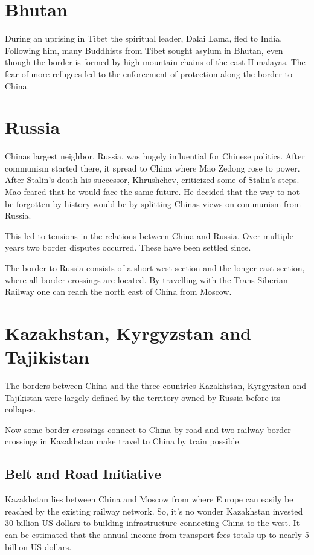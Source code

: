 \documentclass[conference]{IEEEtran}
\begin{document}
	\section{Bhutan}
	During an uprising in Tibet the spiritual leader, Dalai Lama, fled to India\cite{time_howAndWhyTheDalaiLamaLeftTibet}. Following him, many Buddhists from Tibet sought asylum in Bhutan, even though the border is formed by high mountain chains of the east Himalayas. The fear of more refugees led to the enforcement of protection along the border to China.
	
	\section{Russia}
	Chinas largest neighbor, Russia, was hugely influential for Chinese politics. After communism started there, it spread to China where Mao Zedong rose to power. After Stalin's death his successor, Khrushchev, criticized some of Stalin's steps. Mao feared that he would face the same future. He decided that the way to not be forgotten by history would be by splitting Chinas views on communism from Russia.
	
	This led to tensions in the relations between China and Russia. Over multiple years two border disputes occurred. These have been settled since.
	
	The border to Russia consists of a short west section and the longer east section, where all border crossings are located. By travelling with the Trans-Siberian Railway one can reach the north east of China from Moscow.
	
	\section{Kazakhstan, Kyrgyzstan and Tajikistan}
	The borders between China and the three countries Kazakhstan, Kyrgyzstan and Tajikistan were largely defined by the territory owned by Russia before its collapse.
	
	Now some border crossings connect to China by road and two railway border crossings in Kazakhstan make travel to China by train possible.
	
	\subsection{Belt and Road Initiative}
	Kazakhstan lies between China and Moscow from where Europe can easily be reached by the existing railway network. So, it's no wonder Kazakhstan invested 30 billion US dollars to building infrastructure connecting China to the west. It can be estimated that the annual income from transport fees totals up to nearly 5 billion US dollars.
	
\end{document}
